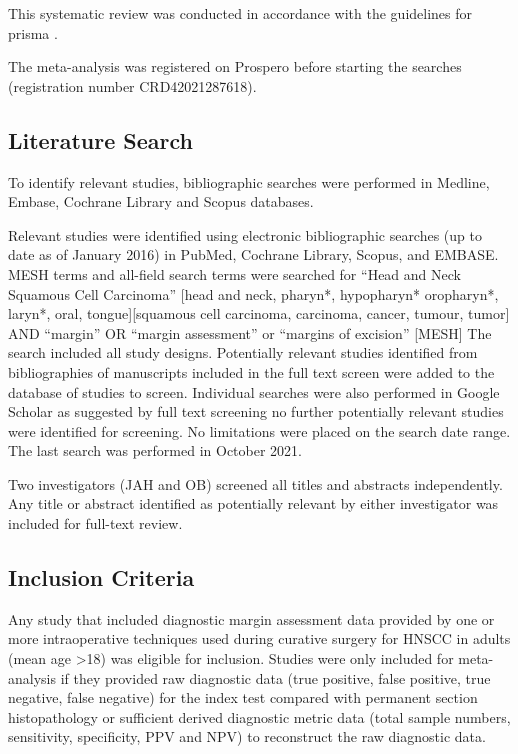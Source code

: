 This systematic review was conducted in accordance with the guidelines for \Gls{prisma} \cite{moherPreferredReportingItems2010}.


The meta-analysis was registered on Prospero before starting the searches (registration number CRD42021287618).

\subsection{Literature Search}

To identify relevant studies, bibliographic searches were performed in Medline, Embase, Cochrane Library and Scopus databases.

Relevant studies were identified using electronic bibliographic searches (up to date as of January 2016) in PubMed, Cochrane Library, Scopus, and EMBASE. 
MESH terms and all-field search terms were searched for ``Head and Neck Squamous Cell Carcinoma'' [head and neck, pharyn*, hypopharyn* oropharyn*, laryn*, oral, tongue][squamous cell carcinoma, carcinoma, cancer, tumour, tumor] AND ``margin'' OR ``margin assessment'' or ``margins of excision'' [MESH] %
The search included all study designs. 
Potentially relevant studies identified from bibliographies of manuscripts included in the full text screen were added to the database of studies to screen. 
Individual searches were also performed in Google Scholar as suggested by full text screening no further potentially relevant studies were identified for screening. 
No limitations were placed on the search date range. 
The last search was performed in October 2021.


Two investigators (JAH and OB) screened all titles and abstracts independently. Any title or abstract identified as potentially relevant by either investigator was included for full-text review. 


\subsection{Inclusion Criteria}

Any study that included diagnostic margin assessment data provided by one or more intraoperative techniques used during curative surgery for HNSCC in adults (mean age \textgreater 18) was eligible for inclusion.
Studies were only included for meta-analysis if they provided raw diagnostic data (true positive, false positive, true negative, false negative) for the index test compared with permanent section histopathology or sufficient derived diagnostic metric data (total sample numbers, sensitivity, specificity, PPV and NPV) to reconstruct the raw diagnostic data.

